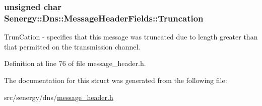 \hypertarget{struct_senergy_1_1_dns_1_1_message_header_fields_a15d1ee99bf788c080001c3216c88274c}{
\subsubsection[{Truncation}]{\setlength{\rightskip}{0pt plus 5cm}unsigned char Senergy\-::\-Dns\-::\-Message\-Header\-Fields\-::\-Truncation}}\label{struct_senergy_1_1_dns_1_1_message_header_fields_a15d1ee99bf788c080001c3216c88274c}


Trun\-Cation -\/ specifies that this message was truncated due to length greater than that permitted on the transmission channel. 



Definition at line 76 of file message\-\_\-header.\-h.



The documentation for this struct was generated from the following file\-:\begin{DoxyCompactItemize}
\item 
src/senergy/dns/\hyperlink{message__header_8h}{message\-\_\-header.\-h}\end{DoxyCompactItemize}
